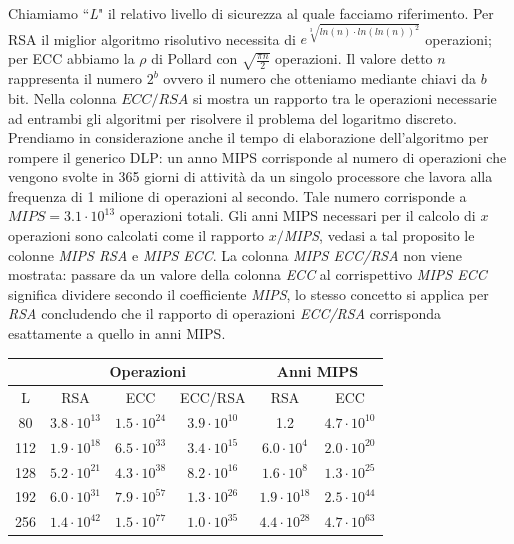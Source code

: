 \documentclass[a4paper,12pt]{tesiinfo}
\newcommand\ddfrac[2]{\frac{\displaystyle #1}{\displaystyle #2}}
\begin{document}
Chiamiamo ``\textit{L}" il relativo livello di sicurezza al quale facciamo riferimento. Per RSA il miglior algoritmo risolutivo necessita di $e^{\sqrt[3]{ln(n) \cdot ln( ln( n) )^2}}$ operazioni; per ECC abbiamo la $\rho$ di Pollard con $\sqrt{\ddfrac{\pi n}{2}}$ operazioni. Il valore detto $n$ rappresenta il numero $2^b$ ovvero il numero che otteniamo mediante chiavi da $b$ bit. Nella colonna $ECC/RSA$ si mostra un rapporto tra le operazioni necessarie ad entrambi gli algoritmi per risolvere il problema del logaritmo discreto.
\\
Prendiamo in considerazione anche il tempo di elaborazione dell'algoritmo per rompere il generico DLP: un anno MIPS corrisponde al numero di operazioni che vengono svolte in 365 giorni di attivit\`a da un singolo processore che lavora alla frequenza di 1 milione di operazioni al secondo. Tale numero corrisponde a $MIPS=3.1 \cdot 10^{13}$ operazioni totali. Gli anni MIPS necessari per il calcolo di $x$ operazioni sono calcolati come il rapporto $x / $\textit{MIPS}, vedasi a tal proposito le colonne \textit{MIPS RSA} e \textit{MIPS ECC}. La colonna \textit{MIPS ECC/RSA} non viene mostrata: passare da un valore della colonna \textit{ECC} al corrispettivo \textit{MIPS ECC} significa dividere secondo il coefficiente \textit{MIPS}, lo stesso concetto si applica per \textit{RSA} concludendo che il rapporto di operazioni \textit{ECC/RSA} corrisponda esattamente a quello in anni MIPS.
\begin{center}
\begin{tabular}{c |c |c |c |c |c }
& \multicolumn{3}{c|}{Operazioni} &\multicolumn{2}{c}{Anni MIPS}\\
\hline
L & RSA & ECC & ECC/RSA & RSA & ECC\\
\hline
80 & $3.8 \cdot 10^{13}$ & $1.5 \cdot 10^{24}$ & $3.9 \cdot 10^{10}$ &  1.2 & $4.7 \cdot 10^{10}$\\
112 & $1.9 \cdot 10^{18}$ & $6.5 \cdot 10^{33}$ & $3.4 \cdot 10^{15}$ &  $6.0 \cdot 10^{4}$ & $2.0 \cdot 10^{20}$\\
128 & $5.2 \cdot 10^{21}$ & $4.3 \cdot 10^{38}$ & $8.2 \cdot 10^{16}$ &  $1.6 \cdot 10^{8}$ & $1.3 \cdot 10^{25}$\\
192 & $6.0 \cdot 10^{31}$ & $7.9 \cdot 10^{57}$ & $1.3 \cdot 10^{26}$ &  $1.9 \cdot 10^{18}$ & $2.5 \cdot 10^{44}$\\
256 & $1.4 \cdot 10^{42}$ & $1.5 \cdot 10^{77}$ & $1.0 \cdot 10^{35}$ &  $4.4 \cdot 10^{28}$ & $4.7 \cdot 10^{63}$
\end{tabular}
\end{center}
\end{document}
